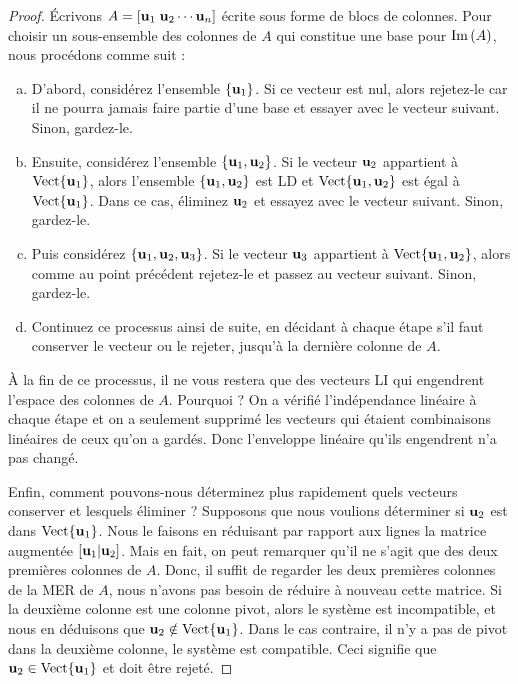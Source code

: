 \begin{proof}
\'Ecrivons $A = [\mathbf{u}_1 \; \mathbf{u}_2 \cdots \mathbf{u}_n]$ écrite sous forme de blocs de colonnes. Pour choisir un
sous-ensemble des colonnes de $A$ qui constitue une base pour $\operatorname{Im}\,(A)$, nous
procédons comme suit :

\begin{enumerate}[(a)]
\item D'abord, considérez l'ensemble $\{ \mathbf{u}_1\}$.  Si ce vecteur est nul, alors rejetez-le car il ne pourra jamais faire partie d'une base et essayer avec le vecteur suivant.  Sinon, gardez-le.
\item Ensuite, considérez l'ensemble $\{ \mathbf{u}_1, \mathbf{u}_2\}$.  Si  le vecteur $\mathbf{u}_2$ appartient à $\textrm{Vect}\{\mathbf{u}_1\}$,
alors l'ensemble $\{\mathbf{u}_1, \mathbf{u}_2\}$ est LD et $\textrm{Vect}\{\mathbf{u}_1,\mathbf{u}_2\}$ est \'egal \`a
$\textrm{Vect}\{\mathbf{u}_1\}$. Dans ce cas, éliminez $\mathbf{u}_2$ et essayez avec le vecteur suivant.  Sinon, gardez-le.
\item Puis considérez $\{ \mathbf{u}_1, \mathbf{u}_2, \mathbf{u}_3\}$.   Si le vecteur $\mathbf{u}_3$ appartient à $\textrm{Vect}\{ \mathbf{u}_1, \mathbf{u}_2\}$, alors comme au point pr\'ec\'edent rejetez-le et passez au vecteur suivant. Sinon, gardez-le.
\item Continuez ce processus ainsi de suite, en décidant à chaque étape s'il faut conserver le
vecteur ou le rejeter, jusqu'à la derni\`ere colonne de $A$.
\end{enumerate}
\`A la fin de ce processus, il ne vous restera que des vecteurs LI qui engendrent l'espace des colonnes de $A$.
Pourquoi ?  On a vérifié l'indépendance linéaire à chaque étape et on a seulement
supprimé les vecteurs qui étaient combinaisons linéaires de ceux qu'on a gardés. Donc l'enveloppe lin\'eaire qu'ils engendrent n'a pas changé.

Enfin, comment pouvons-nous déterminez plus rapidement quels vecteurs conserver et lesquels éliminer ?
Supposons que nous voulions déterminer si $\mathbf{u}_2$ est dans $\textrm{Vect}\{\mathbf{u}_1\}$.  Nous
le faisons en réduisant par rapport aux lignes la matrice augmentée $[\mathbf{u}_1 | \mathbf{u}_2]$.
Mais en fait, on peut remarquer qu'il ne s'agit que des deux premières colonnes de $A$. Donc, il suffit de regarder les deux premières colonnes de la MER de $A$, nous n'avons pas besoin de 
réduire à nouveau cette matrice.  
Si la deuxième colonne est une colonne pivot, alors le système est incompatible, et nous en déduisons  que  $\mathbf{u}_2 \notin \textrm{Vect}\{\mathbf{u}_1\}$.
Dans le cas contraire, il n'y a pas de pivot dans la deuxi\`eme colonne, le système est compatible.
Ceci signifie que $\mathbf{u}_2 \in \textrm{Vect}\{\mathbf{u}_1\}$ et doit être rejeté.


\end{proof}
